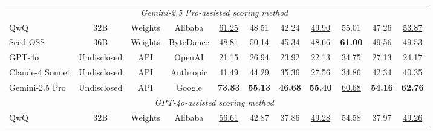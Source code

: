 \begin{table}[tbp]
{\begin{tabular}{lccc|cccccc|c}
            \multicolumn{11}{c}{\textcolor{myorange}{\textit{Gemini-2.5 Pro-assisted scoring method~\citep{comanici2025gemini}}}} \\
QwQ   & 32B & Weights& Alibaba & \underline{61.25} & 48.51 & 42.24 & \underline{49.90} & 55.01 & 47.26 & \underline{53.87} \\
Seed-OSS     & 36B &Weights & ByteDance & 48.81 &\underline{50.14} & \underline{45.34} & 48.66 & \textbf{61.00} &\underline{49.56} & 49.53 \\
GPT-4o  & Undisclosed & API & OpenAI & 21.15 & 26.94 & 23.92 & 22.13 & 34.75 & 27.13 & 24.17 \\
Claude-4 Sonnet  & Undisclosed & API & Anthropic & 41.49 & 44.29 & 35.36 & 27.56 & 34.86 & 42.34 & 40.35 \\
Gemini-2.5 Pro  & Undisclosed & API & Google & \textbf{73.83} & \textbf{55.13} & \textbf{46.68} & \textbf{55.40} & \underline{60.68} & \textbf{54.16} & \textbf{62.76} \\
            \midrule
            \multicolumn{11}{c}{\textcolor{myorange}{\textit{GPT-4o-assisted scoring method~\citep{hurst2024gpt-4o}}}} \\
QwQ   & 32B & Weights& Alibaba & \underline{56.61} & 42.87 & 37.86 & \underline{49.28} & 54.58 & 37.97 & \underline{49.26} \\

\end{tabular}}
\end{table}
